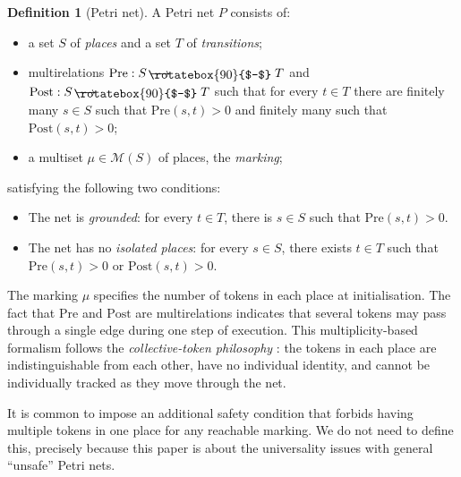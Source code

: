\documentclass[11pt,a4paper]{article}
\theoremstyle{plain}
\theoremstyle{definition}
\newtheorem{definition}[theorem]{Definition}
\theoremstyle{remark}
\newcommand{\calM}{\mathcal{M}}
\newcommand{\Pre}{\mathrm{Pre}}
\newcommand{\Post}{\mathrm{Post}}
\newcommand{\profto}{\mathrel{\ooalign{$\longrightarrow$\cr\hfil\!\raisebox{-1.2pt}{\rotatebox{90}{$-$}}\hfil\cr}}}
\begin{document}
\begin{definition}[Petri net]
  A Petri net $P$ consists of:
  \begin{itemize}
  \item a set $S$ of \emph{places} and a set $T$ of \emph{transitions};
  \item multirelations $\Pre : S \profto T$ and $\Post : S \profto T$ such that for every $t\in T$ there are finitely many $s \in S$ such that $\Pre(s, t) > 0$ and finitely many such that $\Post(s, t) > 0$;
  \item a multiset $\mu \in \calM(S)$ of places, the \emph{marking};
  \end{itemize}
satisfying the following two conditions:
\begin{itemize}
    \item The net is \emph{grounded}: for every $t \in T$, there is $s \in S$ such that $\Pre(s,
      t) > 0$.
    \item The net has no \emph{isolated places}: for every $s \in S$, there exists $t \in T$ such that $\Pre(s,t) > 0$ or $\Post(s, t) > 0$.
\end{itemize}
\end{definition}
The marking $\mu$ specifies the number of tokens in each place at
initialisation. The fact that $\Pre$ and $\Post$ are multirelations
indicates that several tokens may pass through a single edge
during one step of execution. This multiplicity-based formalism follows the
\emph{collective-token philosophy} \cite{van2009configuration}: the tokens in each place are
indistinguishable from each other, have no individual identity, and
cannot be individually tracked as they move through the net.


It is common to impose an additional safety condition that forbids having
multiple tokens in one place \cite{ES2} for any reachable marking. We do not need to define this, precisely because this paper is about the universality issues with general ``unsafe'' Petri nets.
\end{document}
